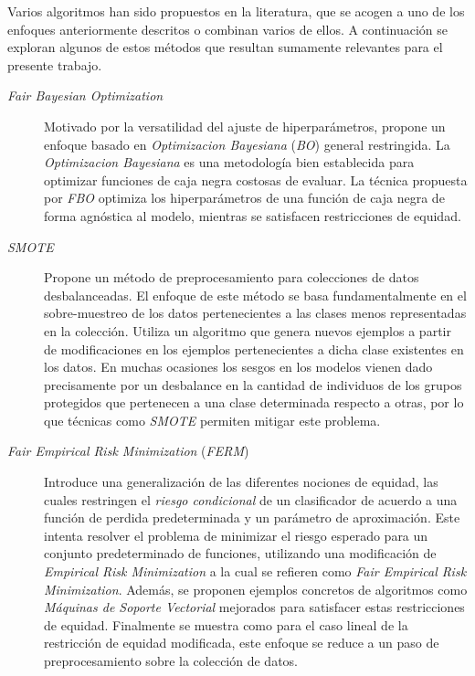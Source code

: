 Varios algoritmos han sido propuestos en la literatura, que se acogen a uno de los enfoques anteriormente descritos o combinan varios de ellos.
A continuación se exploran algunos de estos métodos que resultan sumamente relevantes para el presente trabajo.

\begin{description}

\item[\emph{Fair Bayesian Optimization}~\parencite{perrone2021fbo}]
Motivado por la versatilidad del ajuste de hiperparámetros, propone un enfoque basado en \emph{Optimizacion Bayesiana} (\emph{BO}) general restringida.
La \emph{Optimizacion Bayesiana} es una metodología bien establecida para optimizar funciones de caja negra costosas de evaluar.
La técnica propuesta por \emph{FBO} optimiza los hiperparámetros de una función de caja negra de forma agnóstica al modelo, mientras se satisfacen restricciones de equidad.

\item[\emph{SMOTE} \parencite{chawla2002smote}]
Propone un método de preprocesamiento para colecciones de datos desbalanceadas.
El enfoque de este método se basa fundamentalmente en el sobre-muestreo de los datos pertenecientes a las clases menos representadas en la colección.
Utiliza un algoritmo que genera nuevos ejemplos a partir de modificaciones en los ejemplos pertenecientes a dicha clase existentes en los datos.
En muchas ocasiones los sesgos en los modelos vienen dado precisamente por un desbalance en la cantidad de individuos de los grupos protegidos que pertenecen a una clase determinada respecto a otras, por lo que técnicas como \emph{SMOTE} permiten mitigar este problema.

\item[\emph{Fair Empirical Risk Minimization} (\emph{FERM}) \parencite{FERM}]
Introduce una generalización de las diferentes nociones de equidad, las cuales restringen el \emph{riesgo condicional} de un clasificador de acuerdo a una función de perdida predeterminada y un parámetro de aproximación.
Este intenta resolver el problema de minimizar el riesgo esperado para un conjunto predeterminado de funciones, utilizando una modificación de \emph{Empirical Risk Minimization} a la cual se refieren como \emph{Fair Empirical Risk Minimization}.
Además, se proponen ejemplos concretos de algoritmos como \emph{Máquinas de Soporte Vectorial} mejorados para satisfacer estas restricciones de equidad.
Finalmente se muestra como para el caso lineal de la restricción de equidad modificada, este enfoque se reduce a un paso de preprocesamiento sobre la colección de datos. %


\end{description}
